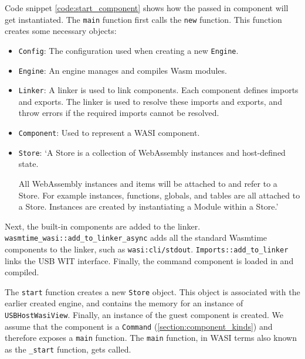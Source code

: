 Code snippet \ref{code:start_component} shows how the passed in component will get instantiated. The \texttt{main} function first calls the \texttt{new} function. This function creates some necessary objects: 
\begin{itemize}
\item \texttt{Config}: The configuration used when creating a new \texttt{Engine}.
\item \texttt{Engine}: An engine manages and compiles Wasm modules.
\item \texttt{Linker}: A linker is used to link components. Each component defines imports and exports. The linker is used to resolve these imports and exports, and throw errors if the required imports cannot be resolved.
\item \texttt{Component}: Used to represent a \acrshort{WASI} component.
\item \texttt{Store}: `A Store is a collection of WebAssembly instances and host-defined state.

All WebAssembly instances and items will be attached to and refer to a Store. For example instances, functions, globals, and tables are all attached to a Store. Instances are created by instantiating a Module within a Store.' \cite{wasmtime_store}
\end{itemize}

Next, the built-in components are added to the linker. \texttt{wasmtime\_wasi::add\_to\_linker\_async} adds all the standard Wasmtime components to the linker, such as \texttt{wasi:cli/stdout}. \texttt{Imports::add\_to\_linker} links the USB \acrshort{WIT} interface. Finally, the command component is loaded in and compiled.

The \texttt{start} function creates a new \texttt{Store} object. This object is associated with the earlier created engine, and contains the memory for an instance of \texttt{USBHostWasiView}. Finally, an instance of the guest component is created. We assume that the component is a \texttt{Command} (\ref{section:component_kinds}) and therefore exposes a \texttt{main} function. The \texttt{main} function, in \acrshort{WASI} terms also known as the \texttt{\_start} function, gets called.

